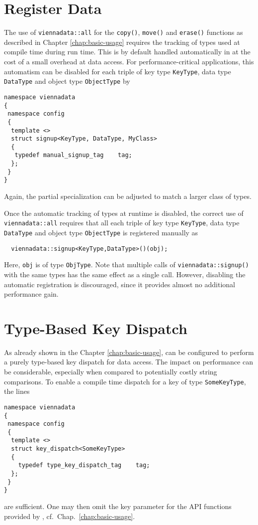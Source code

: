 
\section{Register Data} \label{sec:register-data}
The use of \lstinline|viennadata::all| for the \lstinline|copy()|, \lstinline|move()| and \lstinline|erase()| functions as described in Chapter \ref{chap:basic-usage}
requires the tracking of types used at compile time during run time. This is by default handled automatically in {\ViennaData} at the cost of a small overhead at data access.
For performance-critical applications, this automatism can be disabled for each triple of key type \lstinline|KeyType|, data type \lstinline|DataType| and object type \lstinline|ObjectType| by
\begin{lstlisting}
namespace viennadata
{
 namespace config
 {
  template <>
  struct signup<KeyType, DataType, MyClass>
  {
   typedef manual_signup_tag    tag;
  };
 }
}
\end{lstlisting}
Again, the partial specialization can be adjusted to match a larger class of types.

Once the automatic tracking of types at runtime is disabled, the correct use of \lstinline|viennadata::all| requires that all each triple of key type \lstinline|KeyType|, data type \lstinline|DataType| and object type \lstinline|ObjectType| is registered manually as
\begin{lstlisting}
  viennadata::signup<KeyType,DataType>()(obj);
\end{lstlisting}
Here, \lstinline|obj| is of type \lstinline|ObjType|. Note that multiple calls of \lstinline|viennadata::signup()| with the same types has the same effect as a single call.
However, disabling the automatic registration is discouraged, since it provides almost no additional performance gain.

\section{Type-Based Key Dispatch} \label{sec:compiletime-keys}
As already shown in the Chapter \ref{chap:basic-usage}, {\ViennaData} can be configured to perform a purely type-based key dispatch for data access.
The impact on performance can be considerable, especially when compared to potentially costly string comparisons.
To enable a compile time dispatch for a key of type \lstinline|SomeKeyType|, the lines
\begin{lstlisting}
namespace viennadata
{
 namespace config
 {
  template <>
  struct key_dispatch<SomeKeyType>
  {
    typedef type_key_dispatch_tag    tag;
  };
 }
} 
\end{lstlisting}
are sufficient. One may then omit the key parameter for the API functions provided by {\ViennaData}, cf.~Chap.~\ref{chap:basic-usage}.

